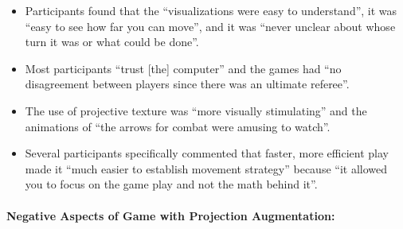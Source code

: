 \documentclass[review]{vgtc}                 %
\begin{document}
\begin{itemize}

\vspace{-0.05in}

\item
Participants found that the ``visualizations were easy to understand'',
it was
``easy to see how far you can move'',
and it was ``never unclear about whose turn it was or what could be done''.
\vspace{\mysep}

\item 
Most participants ``trust [the] computer'' and the games had
``no disagreement between players since there was an ultimate referee''.
\vspace{\mysep}

\item 
The use of projective texture was  ``more visually stimulating''
and the animations of
``the arrows for combat were amusing to watch''.
\vspace{\mysep}

\item 
Several participants specifically commented that faster, more
efficient play made it ``much easier to establish movement strategy''
because ``it allowed you to focus on the game play and not the math
behind it''.

\end{itemize}

\noindent
\paragraph{Negative Aspects of Game with Projection Augmentation:}
\end{document}

